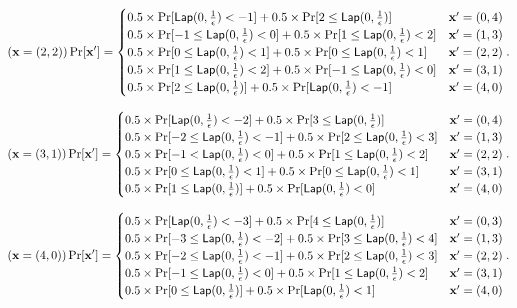 \documentclass{article}
\begin{document}
{\[
(\dataobs = (2,2)) \Pr[\dataobs']
= \begin{cases}
 	0.5 \times 
 	\Pr[	\lap{0}{\frac{1}{\epsilon}}	<	-1]
 	+ 	
 	0.5 \times 
 	\Pr[	2	\leq \lap{0}{\frac{1}{\epsilon}}] 
%
	& \dataobs' = (0, 4)\\
%
 	0.5 \times 
 	\Pr[	-1	\leq \lap{0}{\frac{1}{\epsilon}}	<	0] 
 	+ 	
 	0.5 \times 
 	\Pr[	1	\leq \lap{0}{\frac{1}{\epsilon}}	<	2] 
%
	& \dataobs' = (1, 3)\\
%
 	0.5 \times 
 	\Pr[	0	\leq	\lap{0}{\frac{1}{\epsilon}}	<	1] 
 	+ 	
 	0.5 \times 
 	\Pr[	0	\leq \lap{0}{\frac{1}{\epsilon}}	<	1] 
%
& \dataobs' = (2, 2)\\
%
 	0.5 \times 
 	\Pr[	1	\leq	\lap{0}{\frac{1}{\epsilon}}	<	2] 
 	+ 	
 	0.5 \times 
 	\Pr[	-1 	\leq	\lap{0}{\frac{1}{\epsilon}}	<	0] 
%
& \dataobs' = (3, 1)\\
%
 	0.5 \times 
 	\Pr[	2	\leq	\lap{0}{\frac{1}{\epsilon}}	] 
 	+ 	
 	0.5 \times 
 	\Pr[	\lap{0}{\frac{1}{\epsilon}}	<	-1] 
%
& \dataobs' = (4, 0)
\end{cases}.
\]


\[
( \dataobs = (3,1) ) \Pr[\dataobs']
= \begin{cases}
 	0.5 \times 
 	\Pr[	\lap{0}{\frac{1}{\epsilon}}	<	-2] 
 	+ 	
 	0.5 \times 
 	\Pr[	3	\leq \lap{0}{\frac{1}{\epsilon}}] 
	& \dataobs' = (0, 4)\\
%
 	0.5 \times 
 	\Pr[	-2	\leq \lap{0}{\frac{1}{\epsilon}}	<	-1] 
 	+ 	
 	0.5 \times 
 	\Pr[	2	\leq \lap{0}{\frac{1}{\epsilon}}	<	3] 
	& \dataobs' = (1, 3)\\
%
 	0.5 \times 
 	\Pr[	-1	<	\lap{0}{\frac{1}{\epsilon}}		<	0] 
 	+ 	
 	0.5 \times 
 	\Pr[	1	\leq \lap{0}{\frac{1}{\epsilon}}	<	2] 
	& \dataobs' = (2, 2)\\
%
 	0.5 \times 
 	\Pr[	0	\leq	\lap{0}{\frac{1}{\epsilon}}	<	1] 
 	+ 	
 	0.5 \times 
 	\Pr[	0	\leq	\lap{0}{\frac{1}{\epsilon}}	<	1] 
	& \dataobs' = (3, 1)\\
%
 	0.5 \times 
 	\Pr[	1	\leq	\lap{0}{\frac{1}{\epsilon}}	] 
 	+ 	
 	0.5 \times 
 	\Pr[	\lap{0}{\frac{1}{\epsilon}}	<	0] 
%
& \dataobs' = (4, 0)
\end{cases}.
\]


\[
(\dataobs = (4,0)) \Pr[\dataobs']
= \begin{cases}
 	0.5 \times 
 	\Pr[	\lap{0}{\frac{1}{\epsilon}}	<	-3] 
 	+ 	
 	0.5 \times 
 	\Pr[	4	\leq \lap{0}{\frac{1}{\epsilon}}] 
	& \dataobs' = (0, 3)\\
%
 	0.5 \times 
 	\Pr[	-3	\leq \lap{0}{\frac{1}{\epsilon}}	<	-2] 
 	+ 	
 	0.5 \times 
 	\Pr[	3	\leq \lap{0}{\frac{1}{\epsilon}}	<	4] 
	& \dataobs' = (1, 3)\\
%
 	0.5 \times 
 	\Pr[	-2	\leq	\lap{0}{\frac{1}{\epsilon}}	<	-1] 
 	+ 	
 	0.5 \times 
 	\Pr[	2	\leq 	\lap{0}{\frac{1}{\epsilon}}	<	3] 
	& \dataobs' = (2, 2)\\
%
 	0.5 \times 
 	\Pr[	-1	\leq	\lap{0}{\frac{1}{\epsilon}}	<	0] 
 	+ 	
 	0.5 \times 
 	\Pr[	1	\leq	\lap{0}{\frac{1}{\epsilon}}	<	2] 
	& \dataobs' = (3, 1)\\
%
 	0.5 \times 
 	\Pr[	0	\leq	\lap{0}{\frac{1}{\epsilon}}	] 
 	+ 	
 	0.5 \times 
 	\Pr[	\lap{0}{\frac{1}{\epsilon}}	<	1] 
%
& \dataobs' = (4, 0)
\end{cases}.
\]
}
\end{document}
